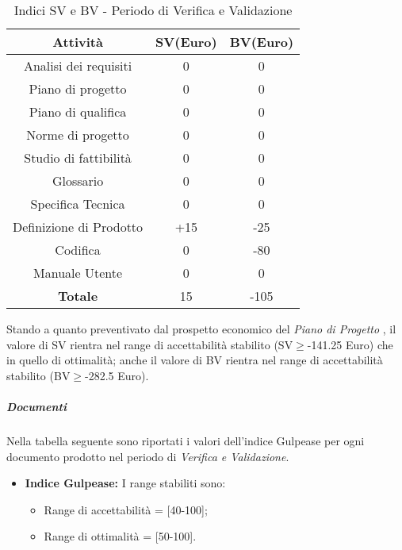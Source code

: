       \begin{table}[H]
        \centering
        \begin{tabular}{|c|c|c|}
          \hline
          \textbf{Attività} & \textbf{SV}(Euro)  & \textbf{BV}(Euro) \\
          \hline
          Analisi dei requisiti  & 0 & 0  \\
          Piano di progetto & 0 & 0\\
          Piano di qualifica  & 0  & 0\\
          Norme di progetto & 0  & 0 \\
          Studio di fattibilità & 0  & 0  \\
          Glossario & 0  & 0  \\
          Specifica Tecnica & 0 & 0\\
          Definizione di Prodotto & +15 & -25\\
          Codifica & 0 & -80\\
          Manuale Utente & 0 & 0\\
          \hline
          \textbf{Totale} & 15  & -105  \\
          \hline
        \end{tabular}
        \caption{Indici SV e BV - Periodo di Verifica e Validazione}
      \end{table}
      Stando a quanto preventivato dal prospetto economico del \emph{Piano di Progetto \VersionePP{}}, il valore di SV rientra nel range di accettabilità stabilito (SV\(\geq\)-141.25 Euro) che in quello di ottimalità;
      anche il valore di BV rientra nel range di accettabilità stabilito (BV\(\geq\)-282.5 Euro).      
      
      \subparagraph{Documenti}
      Nella tabella seguente sono riportati i valori dell'indice Gulpease per ogni documento prodotto nel periodo di \textit{Verifica e Validazione}.\\

\begin{itemize}
\item \textbf{Indice Gulpease: }I range stabiliti sono:
      \begin{itemize}
        \item Range di accettabilità = [40-100];
        \item Range di ottimalità = [50-100].
      \end{itemize}
\end{itemize}      
      
